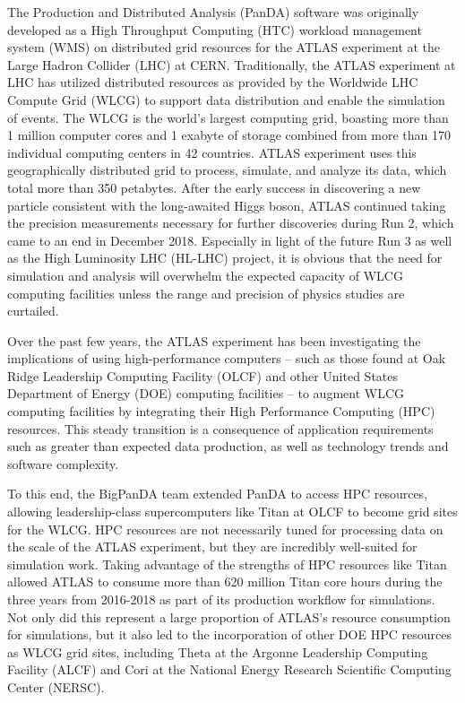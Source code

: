 

The Production and Distributed Analysis (PanDA) software was originally
developed as a High Throughput Computing (HTC) workload management system (WMS)
on distributed grid resources for the ATLAS experiment at the Large Hadron
Collider (LHC) at CERN. Traditionally, the ATLAS experiment at LHC has utilized
distributed resources as provided by the Worldwide LHC Compute Grid (WLCG) to
support data distribution and enable the simulation of events. The WLCG is the
world's largest computing grid, boasting more than 1 million computer cores and
1 exabyte of storage combined from more than 170 individual computing centers
in 42 countries. ATLAS experiment uses this geographically distributed grid to
process, simulate, and analyze its data, which total more than 350 petabytes.
After the early success in discovering a new particle consistent with the
long-awaited Higgs boson, ATLAS continued taking the precision measurements
necessary for further discoveries during Run 2, which came to an end in
December 2018. Especially in light of the future Run 3 as well as the High
Luminosity LHC (HL-LHC) project, it is obvious that the need for simulation and
analysis will overwhelm the expected capacity of WLCG computing facilities
unless the range and precision of physics studies are curtailed.

Over the past few years, the ATLAS experiment has been investigating the
implications of using high-performance computers -- such as those found at Oak
Ridge Leadership Computing Facility (OLCF) and other United States Department
of Energy (DOE) computing facilities -- to augment WLCG computing facilities by
integrating their High Performance Computing (HPC) resources. This steady
transition is a consequence of application requirements such as greater than
expected data production, as well as technology trends and software complexity.

To this end, the BigPanDA team extended PanDA to access HPC resources, allowing
leadership-class supercomputers like Titan at OLCF to become grid sites for the
WLCG. HPC resources are not necessarily tuned for processing data on the scale
of the ATLAS experiment, but they are incredibly well-suited for simulation
work. Taking advantage of the strengths of HPC resources like Titan allowed
ATLAS to consume more than 620 million Titan core hours during the three years
from 2016-2018 as part of its production workflow for simulations. Not only did
this represent a large proportion of ATLAS's resource consumption for
simulations, but it also led to the incorporation of other DOE HPC resources as
WLCG grid sites, including Theta at the Argonne Leadership Computing Facility
(ALCF) and Cori at the National Energy Research Scientific Computing Center
(NERSC).

